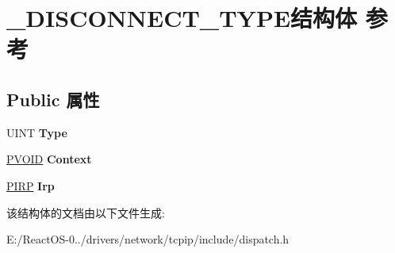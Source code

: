 \hypertarget{struct___d_i_s_c_o_n_n_e_c_t___t_y_p_e}{}\section{\+\_\+\+D\+I\+S\+C\+O\+N\+N\+E\+C\+T\+\_\+\+T\+Y\+P\+E结构体 参考}
\label{struct___d_i_s_c_o_n_n_e_c_t___t_y_p_e}
\subsection*{Public 属性}
\begin{DoxyCompactItemize}
\item 
\mbox{\label{struct___d_i_s_c_o_n_n_e_c_t___t_y_p_e_aae03f83db1c8fe0447dc3eddc46c0510}} 
U\+I\+NT {\bfseries Type}
\item 
\mbox{\label{struct___d_i_s_c_o_n_n_e_c_t___t_y_p_e_afe61a25df7bad3ebd948ca7388614802}} 
\hyperlink{interfacevoid}{P\+V\+O\+ID} {\bfseries Context}
\item 
\mbox{\label{struct___d_i_s_c_o_n_n_e_c_t___t_y_p_e_a66ec3a19b52008d8b6bfaf05b848de70}} 
\hyperlink{interfacevoid}{P\+I\+RP} {\bfseries Irp}
\end{DoxyCompactItemize}


该结构体的文档由以下文件生成\+:\begin{DoxyCompactItemize}
\item 
E\+:/\+React\+O\+S-\/0../drivers/network/tcpip/include/dispatch.\+h\end{DoxyCompactItemize}
